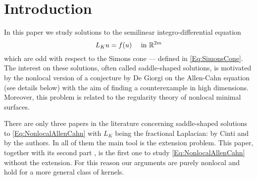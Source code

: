 \section{Introduction}
\label{Sec:Introduction}


In this paper we study solutions to the semilinear integro-differential equation
\begin{equation}
\label{Eq:NonlocalAllenCahn}
L_K u = f(u) \quad \textrm{ in } \mathbb{R}^{2m}
\end{equation}
which are odd with respect to the Simons cone --- defined in \eqref{Eq:SimonsCone}. The interest on these solutions, often called saddle-shaped solutions, is motivated by the nonlocal version of a conjecture by De Giorgi on the Allen-Cahn equation (see details below) with the aim of finding a counterexample in high dimensions. Moreover, this problem is related to the regularity theory of nonlocal minimal surfaces.

There are only three papers in the literature concerning saddle-shaped solutions to \eqref{Eq:NonlocalAllenCahn} with $L_K$ being the fractional Laplacian: \cite{Cinti-Saddle, Cinti-Saddle2} by Cinti and \cite{Felipe-Sanz-Perela:SaddleFractional} by the authors. In all of them the main tool is the extension problem. This paper, together with its second part  \cite{FelipeSanz-Perela:IntegroDifferentialII}, is the first one to study \eqref{Eq:NonlocalAllenCahn} without the extension. For this reason our arguments are purely nonlocal and hold for a more general class of kernels.


